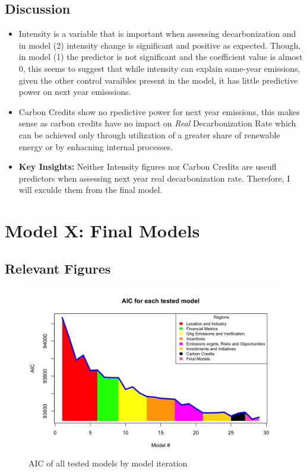 

\subsection{Discussion}

\begin{itemize}
    \item Intensity is a variable that is important when assessing decarbonization and in model (2) intensity change is significant and positive as expected. Though, in model (1) the predictor is not significant and the coefficient value is almost $0$, this seems to suggest that while intensity can explain same-year emissions, given the other control varaibles present in the model, it has little predictive power on next year emisssions.
    \item Carbon Credits show no rpedictive power for next year emissions, this makes sense as carbon credits have no impact on \textit{Real} Decarbonization Rate which can be achieved only through utilization of a greater share of renewable energy or by enhacning internal processes.
    \item \textbf{Key Insights: } Neither Intensity figures nor Carbon Credits are useufl predictors when assessing next year real decarbonization rate. Therefore, I will exculde them from the final model.
\end{itemize}

\section{Model X: Final Models}



\subsection{Relevant Figures}

\begin{figure}[H]
    \centering
    \includegraphics[width=\linewidth]{../notebooks/R/aic.png}
    \caption{AIC of all tested models by model iteration}
    \label{AIC}
\end{figure}

